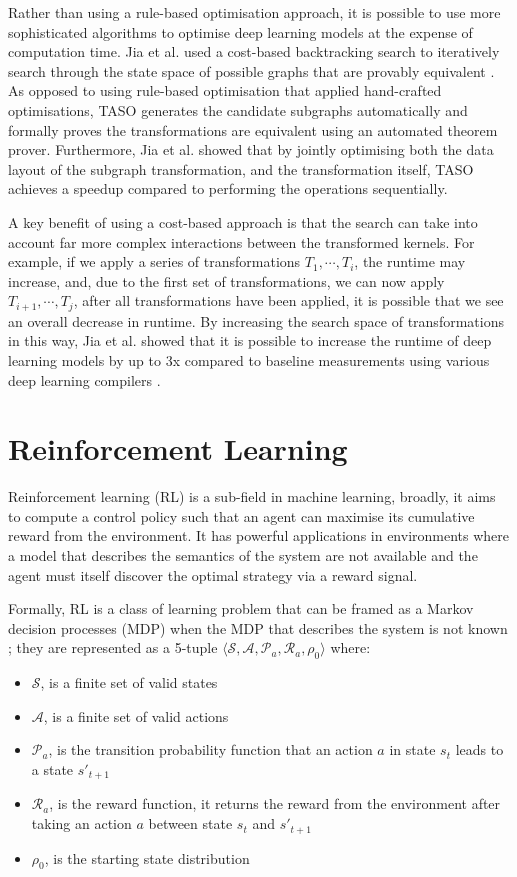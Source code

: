 Rather than using a rule-based optimisation approach, it is possible to use more sophisticated algorithms to optimise deep learning models at the expense of computation time. Jia et al. used a cost-based backtracking search to iteratively search through the state space of possible graphs that are provably equivalent \cite{jia2019taso}. As opposed to using rule-based optimisation that applied hand-crafted optimisations, TASO generates the candidate subgraphs automatically and formally proves the transformations are equivalent using an automated theorem prover. Furthermore, Jia et al. showed that by jointly optimising both the data layout of the subgraph transformation, and the transformation itself, TASO achieves a speedup compared to performing the operations sequentially.

A key benefit of using a cost-based approach is that the search can take into account far more complex interactions between the transformed kernels. For example, if we apply a series of transformations $T_1, \cdots, T_i$, the runtime may increase, and, due to the first set of transformations, we can now apply $T_{i + 1}, \cdots, T_{j}$, after all transformations have been applied, it is possible that we see an overall decrease in runtime. By increasing the search space of transformations in this way, Jia et al. showed that it is possible to increase the runtime of deep learning models by up to 3x \cite{jia2019taso, jia2019optimizing} compared to baseline measurements using various deep learning compilers \cite{ chetlur2014cudnn, cublas2008, tensorrt2017}.


\section{Reinforcement Learning}
Reinforcement learning (RL) is a sub-field in machine learning, broadly, it aims to compute a control policy such that an agent can maximise its cumulative reward from the environment. It has powerful applications in environments where a model that describes the semantics of the system are not available and the agent must itself discover the optimal strategy via a reward signal.

Formally, RL is a class of learning problem that can be framed as a Markov decision processes (MDP) when the MDP that describes the system is not known \cite{bellman1957}; they are represented as a 5-tuple $\langle \mathcal{S}, \mathcal{A}, \mathcal{P}_a, \mathcal{R}_a, \rho_0 \rangle$ where:

\begin{itemize}
  \item $\mathcal{S}$, is a finite set of valid states
  \item $\mathcal{A}$, is a finite set of valid actions
  \item $\mathcal{P}_a$, is the transition probability function that an action $a$ in state $s_t$ leads to a state $s'_{t+1}$
  \item $\mathcal{R}_a$, is the reward function, it returns the reward from the environment after taking an action $a$ between state $s_t$ and $s'_{t+1}$
  \item $\rho_0$, is the starting state distribution
\end{itemize}

